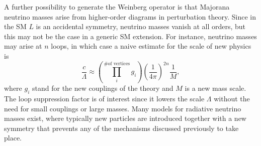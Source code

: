 A further possibility to generate the Weinberg operator is that Majorana neutrino masses arise from higher-order diagrams in perturbation theory. Since in the SM $L$ is an accidental symmetry, neutrino masses vanish at all orders, but this may not be the case in a generic SM extension. For instance, neutrino masses may arise at $n$ loops, in which case a naive estimate for the scale of new physics is
%
\begin{equation}
 \frac{c}{\Lambda} \approx  \left( \prod_{i}^\text{\# of vertices} g_i \right) \left(\frac{1}{4\pi}\right)^{2n} \frac{1}{M},
\end{equation}
%
where $g_i$ stand for the new couplings of the theory and $M$ is a new mass scale. The loop suppression factor is of interest since it lowers the scale $\Lambda$ without the need for small couplings or large masses. Many models for radiative neutrino masses exist, where typically new particles are introduced together with a new symmetry that prevents any of the mechanisms discussed previously to take place. 

